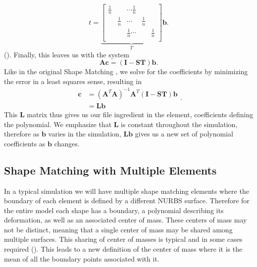 \begin{equation}
\label{eqn:t_solution}
t = 
\underbrace{
\left[\begin{array}{ccccccc}
\frac{1}{n} & & \cdots \frac{1}{n} & & \\
& \frac{1}{n} & \cdots & \frac{1}{n} & \\
& & \frac{1}{n} \cdots & & \frac{1}{n} \\
\end{array} \right]}_{T} 
\mathbf{b}
\text{.}
\end{equation} (). Finally, this leaves us with the system
\begin{equation}
\mathbf{A}\mathbf{c}=(\mathbf{I}-\mathbf{ST})\mathbf{b}
\text{.}
\end{equation}
Like in the original Shape Matching \cite{10.1145/1073204.1073216}, we solve for the coefficients by minimizing the error in a least squares sense, resulting in
\begin{equation}
\label{eqn:c_one_element}
\begin{split}
\mathbf{c} & = (\mathbf{A}^T\mathbf{A})^{-1}\mathbf{A}^T(\mathbf{I-ST})\mathbf{b} \\
           & = \mathbf{L}\mathbf{b}
\end{split}
\text{.}
\end{equation}
This $\mathbf{L}$ matrix thus gives us our file ingredient in the element, coefficients defining the polynomial. We emphasize that $\mathbf{L}$ is constant throughout the simulation, therefore as $\mathbf{b}$ varies in the simulation, $\mathbf{Lb}$ gives us a new set of polynomial coefficients as $\mathbf{b}$ changes. 

\subsection{Shape Matching with Multiple Elements}
In a typical simulation we will have multiple shape matching elements where the boundary of each element is defined by a different NURBS surface. Therefore for the entire model each shape has a boundary, a polynomial describing its deformation, as well as an associated center of mass. These centers of mass may not be distinct, meaning that a single center of mass may be shared among multiple surfaces. This sharing of center of masses is typical and in some cases required (). This leads to a new definition of the center of mass where it is the mean of all the boundary points associated with it.

